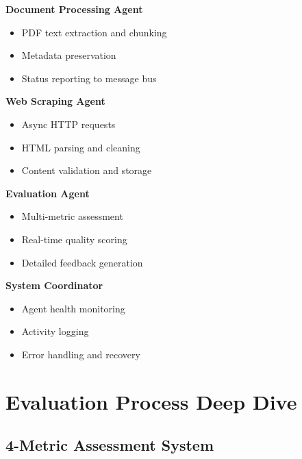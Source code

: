 \documentclass[12pt,a4paper]{article}
\begin{document}
\begin{multicols}{2}
\textbf{Document Processing Agent}
\begin{itemize}
    \item PDF text extraction and chunking
    \item Metadata preservation
    \item Status reporting to message bus
\end{itemize}

\textbf{Web Scraping Agent}
\begin{itemize}
    \item Async HTTP requests
    \item HTML parsing and cleaning
    \item Content validation and storage
\end{itemize}

\textbf{Evaluation Agent}
\begin{itemize}
    \item Multi-metric assessment
    \item Real-time quality scoring
    \item Detailed feedback generation
\end{itemize}

\textbf{System Coordinator}
\begin{itemize}
    \item Agent health monitoring
    \item Activity logging
    \item Error handling and recovery
\end{itemize}
\end{multicols}

\newpage

\section{Evaluation Process Deep Dive}

\subsection{4-Metric Assessment System}
\end{document}
